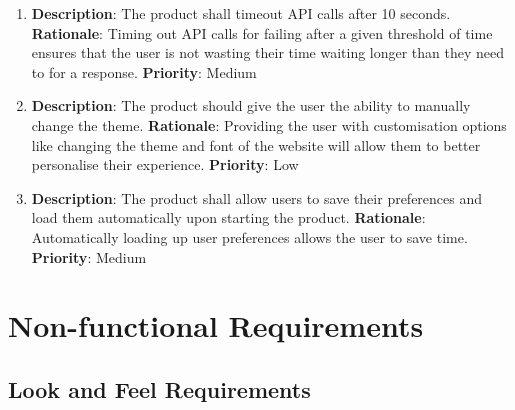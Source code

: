 \documentclass[12pt, titlepage]{article}
\begin{document}
\begin{enumerate}[label = FR-\arabic*, left=\parindent, series=fr]
    \item \textbf{Description}: The product shall timeout API calls after 10 seconds.
    \newline \textbf{Rationale}: Timing out API calls for failing after a given threshold of time ensures that the user is not wasting their time waiting longer than they need to for a response.
    \newline \textbf{Priority}: Medium
    
    \item \textbf{Description}: The product should give the user the ability to manually change the theme.
    \newline \textbf{Rationale}: Providing the user with customisation options like changing the theme and font of the website will allow them to better personalise their experience. 
    \newline \textbf{Priority}: Low
    
    \item \textbf{Description}: The product shall allow users to save their preferences and load them automatically upon starting the product.
    \newline \textbf{Rationale}: Automatically loading up user preferences allows the user to save time.
    \newline \textbf{Priority}: Medium
    
\end{enumerate}

\section{Non-functional Requirements}

\subsection{Look and Feel Requirements}
\end{document}
